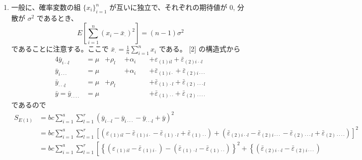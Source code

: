 \documentclass[./main.tex]{subfiles}
\begin{document}
\begin{enumerate}
        \item 一般に、確率変数の組 $\{ x_i \}_{i=1}^n$ が互いに独立で、それぞれの期待値が $0$, 分散が $\sigma^2$ であるとき、
        \begin{equation}
            E \left[ \sum_{i=1}^n (x_i - \bar{x}_{\cdot})^2 \right] = (n - 1) \sigma^2
            \label{eq:2024-ouyo-rikou-1-unbiased-var}
        \end{equation}
        であることに注意する。ここで $\bar{x}_\cdot = \frac{1}{n} \sum_{i=1}^n x_i$ である。
        [2] の構造式から
        \begin{alignat*}{4}
            \bar{y}_{i\cdot\cdot l}     &= \mu &+{} \rho_l  &+ \alpha_i &&+{} \varepsilon_{(1)il}           + \bar{\varepsilon}_{(2)i\cdot\cdot l}\\
            \bar{y}_{i\cdot\cdot\cdot}  &= \mu &\qquad      &+ \alpha_i &&+{} \bar{\varepsilon}_{(1)i\cdot} + \bar{\varepsilon}_{(2)i\cdot\cdot\cdot}\\
            \bar{y}_{\cdot\cdot\cdot l} &= \mu &+ \rho_l    &\qquad     &&+{} \bar{\varepsilon}_{(1)\cdot l} + \bar{\varepsilon}_{(2)\cdot\cdot\cdot l}\\
            \bar{y} = \bar{y}_{\cdot\cdot\cdot\cdot}
                &= \mu &\qquad &\qquad  &&+{} \bar{\varepsilon}_{(1)\cdot\cdot} + \bar{\varepsilon}_{(2)\cdot\cdot\cdot\cdot}
        \end{alignat*}
        であるので
        \begin{align*}
            S_{E(1)}
                &= bc \sum_{i=1}^a \sum_{l=1}^r 
                    \left( \bar{y}_{i\cdot\cdot l} - \bar{y}_{i\cdot\cdot\cdot} - \bar{y}_{\cdot\cdot\cdot l} + \bar{y}  \right)^2\\
                &= bc \sum_{i=1}^a \sum_{l=1}^r
                    \left[ (\varepsilon_{(1)il} - \bar{\varepsilon}_{(1)i\cdot} 
                        - \bar{\varepsilon}_{(1)\cdot l} + \bar{\varepsilon}_{(1)\cdot\cdot} )
                    + (\bar{\varepsilon}_{(2)i\cdot\cdot l} - \bar{\varepsilon}_{(2)i\cdot\cdot\cdot} 
                        - \bar{\varepsilon}_{(2)\cdot\cdot\cdot l} + \bar{\varepsilon}_{(2)\cdot\cdot\cdot\cdot} )
                     \right]^2\\
                &= bc \sum_{i=1}^a \sum_{l=1}^r
                    \left[ \left\{ (\varepsilon_{(1)il} - \bar{\varepsilon}_{(1)i\cdot} )
                        - ( \bar{\varepsilon}_{(1)\cdot l} - \bar{\varepsilon}_{(1)\cdot\cdot} ) \right\}^2
                    + \left\{ (\bar{\varepsilon}_{(2)i\cdot\cdot l} - \bar{\varepsilon}_{(2)i\cdot\cdot\cdot} )

\end{align*}
\end{enumerate}
\end{document}
